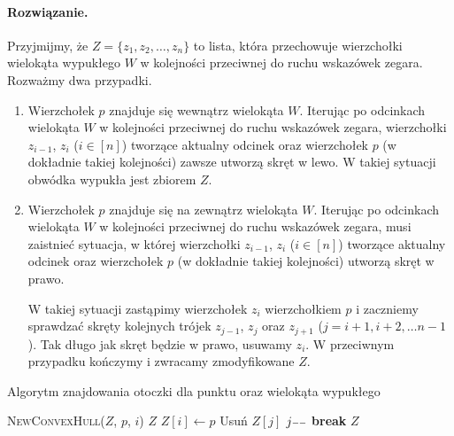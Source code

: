 \paragraph{Rozwiązanie.}
Przyjmijmy, że $Z = \{z_1, z_2, \ldots, z_n\}$ to lista, która przechowuje wierzchołki
wielokąta wypukłego $W$ w kolejności przeciwnej do ruchu wskazówek zegara.
Rozważmy dwa przypadki.
\begin{enumerate}
	\item Wierzchołek $p$ znajduje się wewnątrz wielokąta $W$. Iterując po odcinkach
	wielokąta $W$ w kolejności przeciwnej do ruchu wskazówek zegara, wierzchołki
	$z_{i-1}$, $z_i$ ($i \in [n]$) tworzące aktualny odcinek oraz wierzchołek $p$ (w dokładnie takiej kolejności) zawsze utworzą skręt w lewo. W takiej sytuacji obwódka wypukła jest zbiorem $Z$.
	
	\item Wierzchołek $p$ znajduje się na zewnątrz wielokąta $W$. Iterując po odcinkach
	wielokąta $W$ w kolejności przeciwnej do ruchu wskazówek zegara, musi zaistnieć sytuacja, w której wierzchołki
	$z_{i-1}$, $z_i$ ($i \in [n]$) tworzące aktualny odcinek oraz wierzchołek $p$ (w dokładnie takiej kolejności) utworzą skręt w prawo.
	
	W takiej sytuacji zastąpimy wierzchołek $z_i$ wierzchołkiem $p$ i zaczniemy 
	sprawdzać skręty kolejnych trójek $z_{j-1}$, $z_j$ oraz $z_{j+1}$
	($j = i + 1, i + 2, \dots n - 1$). Tak długo
	jak skręt będzie w prawo, usuwamy $z_i$. W przeciwnym przypadku kończymy i zwracamy zmodyfikowane $Z$.
\end{enumerate}

\begin{algorithm}[H]
	\caption{Algorytm znajdowania otoczki dla punktu oraz wielokąta wypukłego}
	\begin{algorithmic}[1]
		\State \Return \textsc{NewConvexHull}($Z$, $p$, $i$)
		\EndIf
		\EndFor
		\State \Return $Z$
		\EndProcedure		
		\State $Z[i] \gets p$
		\State Usuń $Z[j]$
		\State $j\mm$ 
		\Else
		\State \textbf{break}
		\EndIf
		\EndFor
		\State \Return $Z$
		\EndProcedure
	\end{algorithmic}
\end{algorithm}

